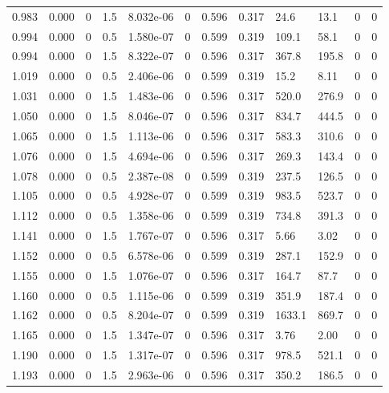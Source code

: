 \documentclass[preview]{standalone}
\begin{document}
{{{\begin{tabular}{L{1.2cm}C{1.2cm} C{0.3cm}C{0.5cm} C{1.4cm}C{1.4cm} C{1.4cm}C{1.4cm} C{1.6cm}C{1.6cm} C{1.6cm}C{1.6cm}}
  0.983  &  0.000  & 0     & 1.5 &  8.032e-06  & 0  &  0.596&   0.317& 24.6 & 13.1   &  0 & 0  \\ 
  0.994  &  0.000  & 0     & 0.5 &  1.580e-07  & 0  &  0.599&   0.319& 109.1 & 58.1   &  0 & 0  \\ 
  0.994  &  0.000  & 0     & 1.5 &  8.322e-07  & 0  &  0.596&   0.317& 367.8 & 195.8   &  0 & 0  \\ 
  1.019  &  0.000  & 0     & 0.5 &  2.406e-06  & 0  &  0.599&   0.319& 15.2 & 8.11   &  0 & 0  \\ 
  1.031  &  0.000  & 0     & 1.5 &  1.483e-06  & 0  &  0.596&   0.317& 520.0 & 276.9   &  0 & 0  \\ 
  1.050  &  0.000  & 0     & 1.5 &  8.046e-07  & 0  &  0.596&   0.317& 834.7 & 444.5   &  0 & 0  \\ 
  1.065  &  0.000  & 0     & 1.5 &  1.113e-06  & 0  &  0.596&   0.317& 583.3 & 310.6   &  0 & 0  \\ 
  1.076  &  0.000  & 0     & 1.5 &  4.694e-06  & 0  &  0.596&   0.317& 269.3 & 143.4   &  0 & 0  \\ 
  1.078  &  0.000  & 0     & 0.5 &  2.387e-08  & 0  &  0.599&   0.319& 237.5 & 126.5   &  0 & 0  \\ 
  1.105  &  0.000  & 0     & 0.5 &  4.928e-07  & 0  &  0.599&   0.319& 983.5 & 523.7   &  0 & 0  \\ 
  1.112  &  0.000  & 0     & 0.5 &  1.358e-06  & 0  &  0.599&   0.319& 734.8 & 391.3   &  0 & 0  \\ 
  1.141  &  0.000  & 0     & 1.5 &  1.767e-07  & 0  &  0.596&   0.317& 5.66 & 3.02   &  0 & 0  \\ 
  1.152  &  0.000  & 0     & 0.5 &  6.578e-06  & 0  &  0.599&   0.319& 287.1 & 152.9   &  0 & 0  \\ 
  1.155  &  0.000  & 0     & 1.5 &  1.076e-07  & 0  &  0.596&   0.317& 164.7 & 87.7   &  0 & 0  \\ 
  1.160  &  0.000  & 0     & 0.5 &  1.115e-06  & 0  &  0.599&   0.319& 351.9 & 187.4   &  0 & 0  \\ 
  1.162  &  0.000  & 0     & 0.5 &  8.204e-07  & 0  &  0.599&   0.319& 1633.1 & 869.7   &  0 & 0  \\ 
  1.165  &  0.000  & 0     & 1.5 &  1.347e-07  & 0  &  0.596&   0.317& 3.76 & 2.00   &  0 & 0  \\ 
  1.190  &  0.000  & 0     & 1.5 &  1.317e-07  & 0  &  0.596&   0.317& 978.5 & 521.1   &  0 & 0  \\ 
  1.193  &  0.000  & 0     & 1.5 &  2.963e-06  & 0  &  0.596&   0.317& 350.2 & 186.5   &  0 & 0  \\ 

\end{tabular}}}}
\end{document}

